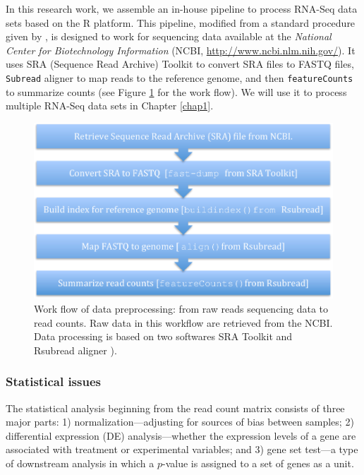 In this research work, we assemble an in-house pipeline to process RNA-Seq data sets based on the R \citep{Rpackage}
platform.
This pipeline, modified from a standard procedure given by \citet{anders2013count},   is designed to work
for sequencing data available at the \textit{National Center for Biotechnology Information} (NCBI,
\url{http://www.ncbi.nlm.nih.gov/}). It uses SRA (Sequence Read Archive) Toolkit
\citep{leinonen2010sequence} to convert SRA files to FASTQ files, \verb|Subread| aligner
\citep{liao2013subread} to map reads to the reference genome, and then \verb|featureCounts| \citep{liao2013featurecounts} to summarize
counts (see Figure \ref{fig:flowchart} for the work flow). We will use it to process multiple
RNA-Seq data sets in Chapter \ref{chap1}.
\begin{figure}[!ht]
	\centering
	\includegraphics[width=0.7\linewidth]{Figures/flowchart.pdf}
	\caption{Work flow of data preprocessing: from raw reads sequencing data to read counts. Raw data
		in this workflow are retrieved from the NCBI. Data processing is based on two softwares SRA
		Toolkit
		\citep{leinonen2010sequence} 
		and Rsubread aligner \citep{liao2013subread}).}
	\label{fig:flowchart}
\end{figure}	



\subsubsection{Statistical issues}
The statistical analysis beginning from the read count matrix consists of three major parts: 1)
normalization---adjusting for sources of bias between samples; 2) differential expression (DE)
analysis---whether the expression levels of a gene are associated with treatment or experimental variables; 
and 3) gene set test---a type of downstream analysis in which a $p$-value is assigned to a set of genes as
a unit.

